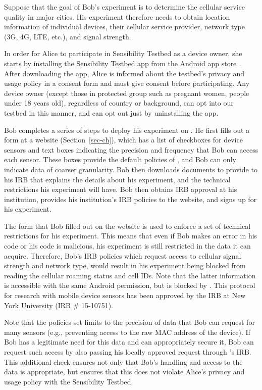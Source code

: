 Suppose that the goal of Bob's experiment is to determine the cellular service
quality in major cities. His experiment therefore needs to obtain location information
of individual devices, their cellular service provider, network
type (3G, 4G, LTE, etc.), and signal strength. 

In order for Alice to participate in Sensibility Testbed as a device owner,
she starts by installing the Sensibility Testbed app from 
the Android app store~\cite{sensibility-app}. After downloading the app, 
Alice is informed about the testbed's privacy and usage policy 
in a consent form and must give consent before participating.
Any device owner (except those in protected group such as pregnant women, 
people under 18 years old), regardless of country or background, can 
opt into our testbed in this manner, and can opt out just by 
uninstalling the app. 

Bob completes a series of steps to deploy his experiment on \sysname.
He first fills out a form at a \sysname website 
(Section~\ref{sec-ch}), which has a list of checkboxes for device sensors 
and text boxes indicating the precision and frequency that Bob can access 
each sensor. These boxes provide the default policies of \sysname, and 
Bob can only indicate data of coarser granularity. 
Bob then downloads 
documents to provide to his IRB that 
explains the details about his experiment, \sysname and the technical 
restrictions his experiment will have. Bob then obtains IRB approval at 
his institution, provides his institution's IRB policies to the 
\sysname website, and signs up for his experiment. 

The form that Bob filled out on the \sysname website is used to
enforce a set of technical restrictions for his experiment.  This means
that even if Bob makes an error in his code or his code is malicious, his 
experiment is still restricted in the data it can acquire. 
 Therefore, Bob's IRB 
policies which request access to cellular signal strength and network type, would result 
in his experiment being blocked from reading the cellular roaming status and cell 
IDs. Note that the latter information is accessible with the same 
Android permission, but is blocked by \sysname.  This
protocol for research with mobile device sensors has been approved by
the IRB at New York University (IRB \# 15-10751).  

Note that the policies set limits to the precision of data that Bob can request
for many sensors (e.g., preventing access to the raw MAC address of the device).
If Bob has a legitimate need for this data and can appropriately secure it,
Bob can request such access by also passing his locally approved request 
through \sysname's IRB.  This additional check ensures not only that Bob's 
handling and access to the data is appropriate, but ensures that this does
not violate Alice's privacy and usage policy with the Sensibility Testbed.

